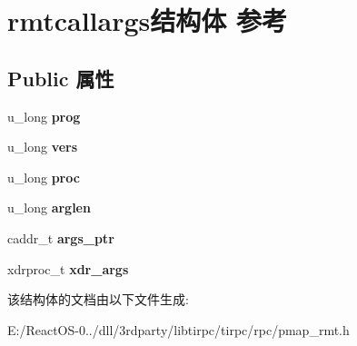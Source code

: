 \hypertarget{structrmtcallargs}{}\section{rmtcallargs结构体 参考}
\label{structrmtcallargs}
\subsection*{Public 属性}
\begin{DoxyCompactItemize}
\item 
\mbox{\label{structrmtcallargs_a43f54b8ece5a4f16232b9a80bb2bfe24}} 
u\+\_\+long {\bfseries prog}
\item 
\mbox{\label{structrmtcallargs_a134b4c479c3b969efd678757359f41eb}} 
u\+\_\+long {\bfseries vers}
\item 
\mbox{\label{structrmtcallargs_a7937faceef3de74ba1ef81dda0b03c0b}} 
u\+\_\+long {\bfseries proc}
\item 
\mbox{\label{structrmtcallargs_afa6a1eb3a78e7bcc9246660454ea3516}} 
u\+\_\+long {\bfseries arglen}
\item 
\mbox{\label{structrmtcallargs_a0bf51e3ba9503c87a24a3dc1af30fe65}} 
caddr\+\_\+t {\bfseries args\+\_\+ptr}
\item 
\mbox{\label{structrmtcallargs_a81894f2b9e9e512ce1b2b39a14d7246a}} 
xdrproc\+\_\+t {\bfseries xdr\+\_\+args}
\end{DoxyCompactItemize}


该结构体的文档由以下文件生成\+:\begin{DoxyCompactItemize}
\item 
E\+:/\+React\+O\+S-\/0../dll/3rdparty/libtirpc/tirpc/rpc/pmap\+\_\+rmt.\+h\end{DoxyCompactItemize}
